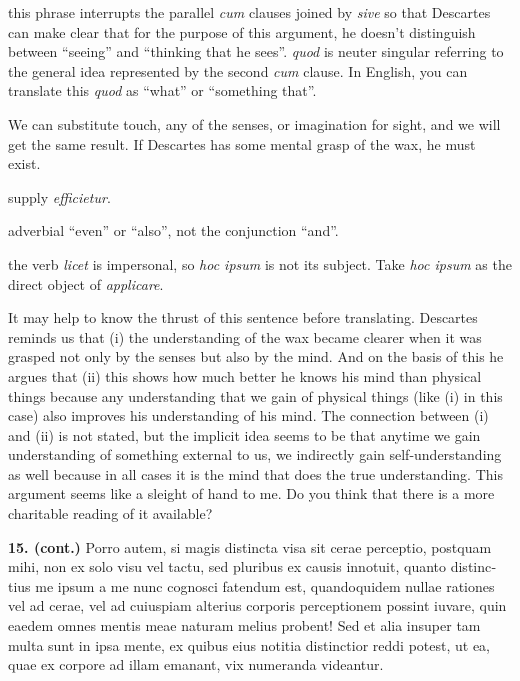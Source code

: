  this phrase interrupts the parallel \textit{cum} clauses joined by \textit{sive} so that Descartes can make clear that for the purpose of this argument, he doesn't distinguish between ``seeing'' and ``thinking that he sees''. \textit{quod} is neuter singular referring to the general idea represented by the second \textit{cum} clause. In English, you can translate this \textit{quod} as ``what'' or ``something that''.

 We can substitute touch, any of the senses, or imagination for sight, and we will get the same result. If Descartes has some mental grasp  of the wax, he must exist.

 supply \textit{efficietur}.

 adverbial ``even'' or ``also'', not the conjunction ``and''.

 the verb \textit{licet} is impersonal, so \textit{hoc ipsum} is not its subject. Take \textit{hoc ipsum} as the direct object of \textit{applicare}.

 It may help to know the thrust of this sentence before translating. Descartes reminds us that (i) the understanding of the wax became clearer when it was grasped not only by the senses but also by the mind. And on the basis of this he argues that (ii) this shows how much better he knows his mind than physical things because any understanding that we gain of physical things (like (i) in this case) also improves his understanding of his mind. The connection between (i) and (ii) is not stated, but the implicit idea seems to be that anytime we gain understanding of something external to us, we indirectly gain self-understanding as well because in all cases it is the mind that does the true understanding. This argument seems like a sleight of hand to me. Do you think that there is a more charitable reading of it available?

\clearpage

\beginnumbering
{}
\pstart
\begin{latin}
    \textenglish{\textbf{15. (cont.)}} Porro autem, si magis distincta visa sit cerae perceptio, postquam mihi, non ex solo visu vel tactu, sed pluribus ex causis innotuit, quanto distinctius me ipsum a me nunc cognosci fatendum est, quandoquidem nullae rationes vel ad cerae, vel ad cuiuspiam alterius corporis perceptionem possint iuvare, quin eaedem omnes mentis meae naturam melius probent! Sed et alia insuper tam multa sunt in ipsa mente, ex quibus eius notitia distinctior reddi potest, ut ea, quae ex corpore ad illam emanant, vix numeranda videantur.
\end{latin}
\pend
\endnumbering

